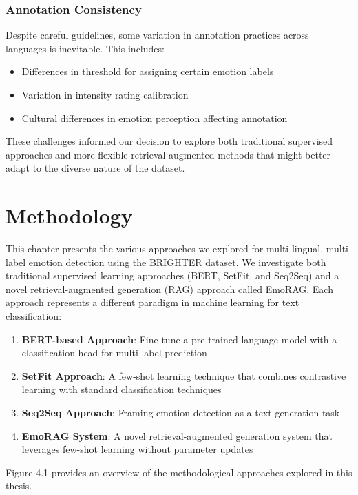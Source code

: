 \documentclass[a4paper,12pt]{extarticle}
\begin{document}
\subsubsection{Annotation Consistency}

Despite careful guidelines, some variation in annotation practices across languages is inevitable. This includes:
\begin{itemize}
\item Differences in threshold for assigning certain emotion labels
\item Variation in intensity rating calibration
\item Cultural differences in emotion perception affecting annotation
\end{itemize}

These challenges informed our decision to explore both traditional supervised approaches and more flexible retrieval-augmented methods that might better adapt to the diverse nature of the dataset.

\section{Methodology}

This chapter presents the various approaches we explored for multi-lingual, multi-label emotion detection using the BRIGHTER dataset. We investigate both traditional supervised learning approaches (BERT, SetFit, and Seq2Seq) and a novel retrieval-augmented generation (RAG) approach called EmoRAG. Each approach represents a different paradigm in machine learning for text classification:

\begin{enumerate}
\item \textbf{BERT-based Approach}: Fine-tune a pre-trained language model with a classification head for multi-label prediction
\item \textbf{SetFit Approach}: A few-shot learning technique that combines contrastive learning with standard classification techniques
\item \textbf{Seq2Seq Approach}: Framing emotion detection as a text generation task
\item \textbf{EmoRAG System}: A novel retrieval-augmented generation system that leverages few-shot learning without parameter updates
\end{enumerate}

Figure 4.1 provides an overview of the methodological approaches explored in this thesis.
\end{document}
